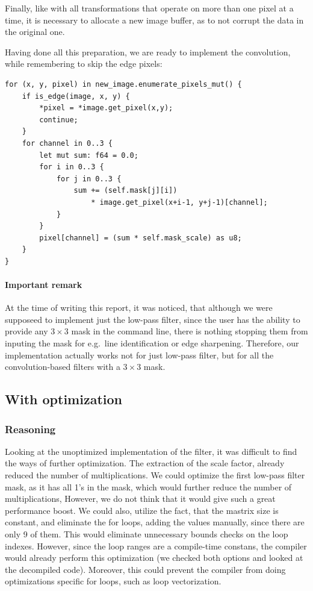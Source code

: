 \documentclass[12pt]{article}
\begin{document}
Finally, like with all transformations that operate on more than one pixel at a time,
it is necessary to allocate a new image buffer, as to not corrupt the data in the original one.

Having done all this preparation, we are ready to implement the convolution, while remembering to skip the edge pixels:

\pagebreak[3]
\begin{lstlisting}
for (x, y, pixel) in new_image.enumerate_pixels_mut() {
    if is_edge(image, x, y) {
        *pixel = *image.get_pixel(x,y);
        continue;
    }
    for channel in 0..3 {
        let mut sum: f64 = 0.0;
        for i in 0..3 {
            for j in 0..3 {
                sum += (self.mask[j][i])
                    * image.get_pixel(x+i-1, y+j-1)[channel];
            }
        }
        pixel[channel] = (sum * self.mask_scale) as u8;
    }
}
\end{lstlisting}

\paragraph{Important remark}
At the time of writing this report, it was noticed, that although we were supposeed to implement just the low-pass filter,
since the user has the ability to provide any $3\times3$ mask in the command line,
there is nothing stopping them from inputing the mask for e.g.\ line identification or edge sharpening.
Therefore, our implementation actually works not for just low-pass filter, but for all the convolution-based filters with a $3\times3$ mask.

\subsection{With optimization}

\subsubsection{Reasoning}

Looking at the unoptimized implementation of the filter, it was difficult to find the ways of further optimization.
The extraction of the scale factor, already reduced the number of multiplications.
We could optimize the first low-pass filter mask, as it has all 1's in the mask, which would further reduce the number of multiplications,
However, we do not think that it would give such a great performance boost.
We could also, utilize the fact, that the mastrix size is constant, and eliminate the for loops, adding the values manually, since there are only 9 of them.
This would eliminate unnecessary bounds checks on the loop indexes.
However, since the loop ranges are a compile-time constans, the compiler would already perform this optimization (we checked both options and looked at the decompiled code).
Moreover, this could prevent the compiler from doing optimizations specific for loops, such as loop vectorization.
\end{document}
